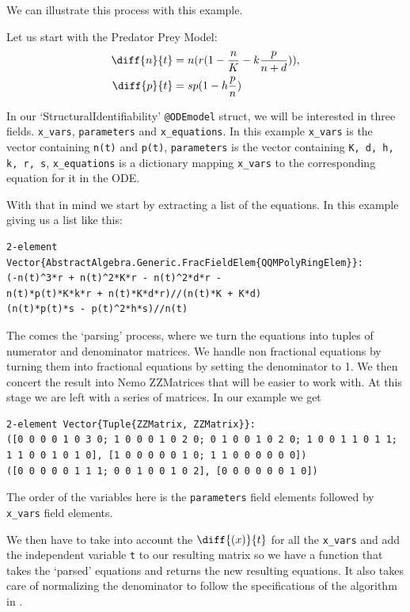 \documentclass[oneside, a4paper, onecolumn, 11pt]{article}
\begin{document}
We can illustrate this process with this example.

Let us start with the Predator Prey Model:
\begin{align*}
    \diff{n}{t}
     & = n (r (1 - \frac{n}{K} - k \frac{p}{n + d})), \\
    \diff{p}{t}
     & = sp (1 - h \frac{p}{n})
\end{align*}

In our `StructuralIdentifiability' \texttt{@ODEmodel} struct, we will be interested in three fields. \texttt{x\_vars}, \texttt{parameters} and \texttt{x\_equations}. In this example \texttt{x\_vars} is the vector containing \texttt{n(t)} and \texttt{p(t)}, \texttt{parameters} is the vector containing \texttt{K, d, h, k, r, s}, \texttt{x\_equations} is a dictionary mapping \texttt{x\_vars} to the corresponding equation for it in the ODE.

With that in mind we start by extracting a list of the equations. In this example giving us a list like this:
\begin{lstlisting}
2-element Vector{AbstractAlgebra.Generic.FracFieldElem{QQMPolyRingElem}}:
(-n(t)^3*r + n(t)^2*K*r - n(t)^2*d*r - 
n(t)*p(t)*K*k*r + n(t)*K*d*r)//(n(t)*K + K*d)
(n(t)*p(t)*s - p(t)^2*h*s)//n(t)
\end{lstlisting}

The comes the `parsing' process, where we turn the equations into tuples of numerator and denominator matrices. We handle non fractional equations by turning them into fractional equations by setting the denominator to 1. We then concert the result into Nemo ZZMatrices that will be easier to work with. At this stage we are left with a series of matrices. In our example we get
\begin{lstlisting}
2-element Vector{Tuple{ZZMatrix, ZZMatrix}}:
([0 0 0 0 1 0 3 0; 1 0 0 0 1 0 2 0; 0 1 0 0 1 0 2 0; 1 0 0 1 1 0 1 1; 1 1 0 0 1 0 1 0], [1 0 0 0 0 0 1 0; 1 1 0 0 0 0 0 0])
([0 0 0 0 0 1 1 1; 0 0 1 0 0 1 0 2], [0 0 0 0 0 0 1 0])
\end{lstlisting}

The order of the variables here is the \texttt{parameters} field elements followed by \texttt{x\_vars}  field elements.

We then have to take into account the \(\diff{(x)}{t}\) for all the \texttt{x\_vars} and add the independent variable \texttt{t} to our resulting matrix so we have a function that takes the `parsed' equations and returns the new resulting equations. It also takes care of normalizing the denominator to follow the specifications of the algorithm in \cite{Hubert2013}.
\end{document}
